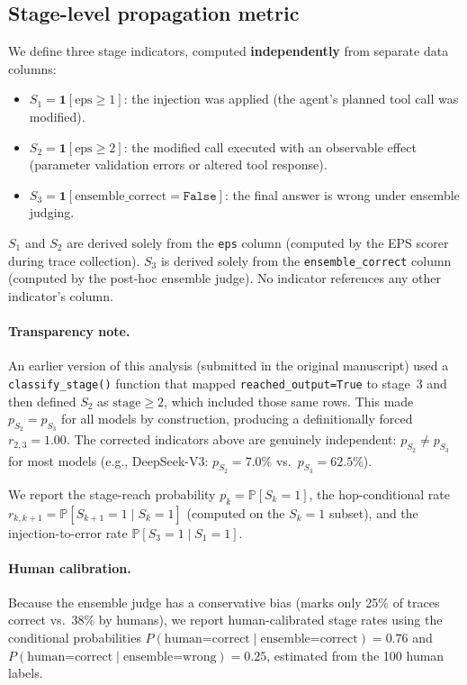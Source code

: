 \documentclass{ieeeaccess}
\renewcommand{\Pr}{\mathbb{P}}
\newcommand{\ind}{\mathbf{1}}
\begin{document}
\subsection{Stage-level propagation metric}
\label{sec:stagedef}

We define three stage indicators, computed \textbf{independently} from
separate data columns:
\begin{itemize}
  \item $S_1 = \ind[\text{eps} \geq 1]$: the injection was applied
    (the agent's planned tool call was modified).
  \item $S_2 = \ind[\text{eps} \geq 2]$: the modified call executed
    with an observable effect (parameter validation errors or altered
    tool response).
  \item $S_3 = \ind[\text{ensemble\_correct} = \texttt{False}]$: the
    final answer is wrong under ensemble judging.
\end{itemize}

$S_1$ and $S_2$ are derived solely from the \texttt{eps} column
(computed by the EPS scorer during trace collection).
$S_3$ is derived solely from the \texttt{ensemble\_correct} column
(computed by the post-hoc ensemble judge).
No indicator references any other indicator's column.

\paragraph{Transparency note.}
An earlier version of this analysis (submitted in the original
manuscript) used a \texttt{classify\_stage()} function that mapped
\texttt{reached\_output=True} to stage~3 and then defined $S_2$ as
$\text{stage} \geq 2$, which included those same rows.
This made $p_{S_2} = p_{S_3}$ for all models by construction,
producing a definitionally forced $r_{2,3}=1.00$.
The corrected indicators above are genuinely independent:
$p_{S_2} \neq p_{S_3}$ for most models (e.g., DeepSeek-V3:
$p_{S_2}=7.0\%$ vs.\ $p_{S_3}=62.5\%$).

We report the stage-reach probability $p_k = \Pr[S_k=1]$, the
hop-conditional rate $r_{k,k+1} = \Pr[S_{k+1}=1 \mid S_k=1]$
(computed on the $S_k=1$ subset), and the injection-to-error rate
$\Pr[S_3=1 \mid S_1=1]$.

\paragraph{Human calibration.}
Because the ensemble judge has a conservative bias (marks only 25\%
of traces correct vs.\ 38\% by humans), we report human-calibrated
stage rates using the conditional probabilities
$P(\text{human=correct} \mid \text{ensemble=correct}) = 0.76$ and
$P(\text{human=correct} \mid \text{ensemble=wrong}) = 0.25$, estimated
from the 100 human labels.
\end{document}
